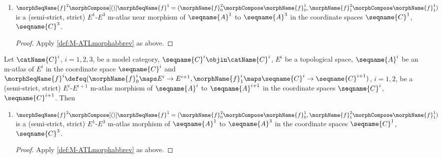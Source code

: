 \documentclass{article}
\begin{document}
\begin{corollary}
\begin{enumerate}[resume]
\item
$
  \morphSeqName{f}^2 \morphCompose[()] \morphSeqName{f}^1 =
  (
    \morphName{f}^2_0 \morphCompose \morphName{f}^1_0,
    \morphName{f}^2_1 \morphCompose \morphName{f}^1_1
  )
$
is a (semi-strict, strict) $E^1$-$E^3$ m-atlas near morphism of
$\seqname{A}^1$ to $\seqname{A}^3$ in the coordinate spaces
$\seqname{C}^1$, $\seqname{C}^3$.

\begin{proof}
Apply \cref{def:M-ATLmorphabbrev} as above.
\end{proof}
\end{enumerate}

Let $\catName{C}^i$, $i=1,2,3$, be a model category,
$\seqname{C}^i \objin \catName{C}^i$, $E^i$ be a topological space,
$\seqname{A}^i$ be an m-atlas of $E^i$ in the coordinate space
$\seqname{C}^i$ and
$
  \morphSeqName{f}^i \defeq
    (
      \morphName{f}^i_0 \maps E^i \to E^{i+1},
      \morphName{f}^i_1 \maps \seqname{C}^i \to \seqname{C}^{i+1}
    )
$, $i=1,2$,
be a (semi-strict, strict) $E^i$-$E^{i+1}$ m-atlas morphism of
$\seqname{A}^i$ to $\seqname{A}^{i+1}$ in the coordinate spaces
$\seqname{C}^i$, $\seqname{C}^{i+1}$. Then

\begin{enumerate}[resume]
\item
$
  \morphSeqName{f}^2 \morphCompose[()] \morphSeqName{f}^1 =
    (
      \morphName{f}^2_0 \morphCompose \morphName{f}^1_0,
      \morphName{f}^2_1 \morphCompose \morphName{f}^1_1
    )
$
is a (semi-strict, strict) $E^1$-$E^3$ m-atlas morphism of
$\seqname{A}^1$ to $\seqname{A}^3$ in the coordinate spaces
$\seqname{C}^1$, $\seqname{C}^3$.

\begin{proof}
Apply \cref{def:M-ATLmorphabbrev} as above.
\end{proof}
\end{enumerate}
\end{corollary}
\end{document}
